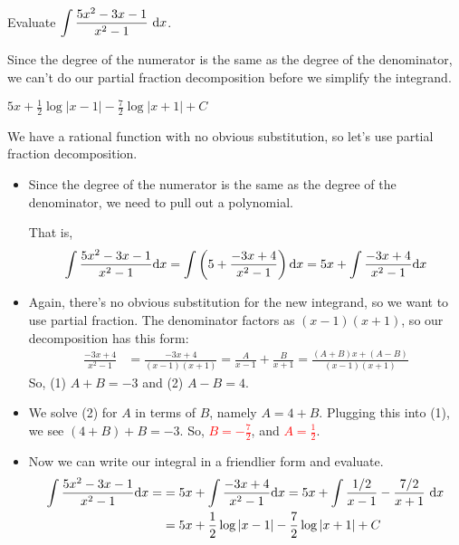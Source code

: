 


\begin{Mquestion}
Evaluate $\displaystyle\int \frac{5x^2-3x-1}{x^2-1}~\mathrm{d}x$.
\end{Mquestion}
\begin{hint}
Since the degree of the numerator is the same as the degree of the denominator, we can't do our partial fraction decomposition before we simplify the integrand.
\end{hint}
\begin{answer}
$\displaystyle5x+\frac{1}{2}\log|x-1| - \frac{7}{2}\log|x+1|+C$
\end{answer}
\begin{solution}
We have a rational function with no obvious substitution, so let's use partial fraction decomposition.
\begin{itemize}
\item Since the degree of the numerator is the same as the degree of the denominator, we need to pull out a polynomial.

\begin{center}
\end{center}

That is,
\[\int \frac{5x^2-3x-1}{x^2-1}\mathrm{d}x = \int\left(5+ \frac{-3x+4}{x^2-1}\right)\mathrm{d}x =5x+ \int \frac{-3x+4}{x^2-1}\mathrm{d}x  \]

\item Again, there's no obvious substitution for the new integrand, so we want to use partial fraction. The denominator factors as $(x-1)(x+1)$, so our decomposition has this form:
\begin{align*}
\frac{-3x+4}{x^2-1}&=\frac{-3x+4}{(x-1)(x+1)} = \frac{A}{x-1}+\frac{B}{x+1} = \frac{(A+B)x+(A-B)}{(x-1)(x+1)}
\end{align*}
So, (1) $A+B=-3$ and (2)  $A-B=4$.
\item We  solve (2) for $A$  in terms of $B$, namely $A=4+B$. Plugging this into (1), we see $(4+B)+B=-3$. So, \textcolor{red}{$B=-\frac{7}{2}$}, and \textcolor{red}{$A=\frac{1}{2}$}.
\item Now we can write our integral in a friendlier form and evaluate.
\begin{align*}
\int \frac{5x^2-3x-1}{x^2-1}\mathrm{d}x =&=5x+ \int \frac{-3x+4}{x^2-1}\mathrm{d}x  =
5x+\int \frac{1/2}{x-1} - \frac{7/2}{x+1}~\mathrm{d}x\\
&=5x+\frac{1}{2}\log|x-1| - \frac{7}{2}\log|x+1|+C
\end{align*}
\end{itemize}
\end{solution}


